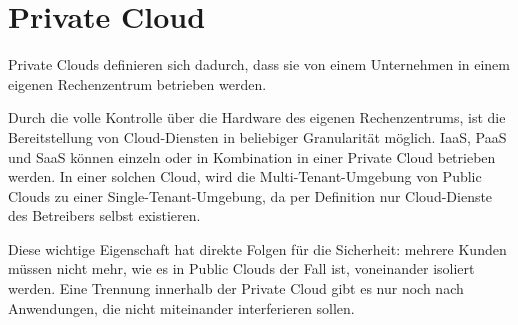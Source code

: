 \documentclass[../main.tex]{subfiles}
\begin{document}



  \section{Private Cloud}
  \label{privateCloud}
    Private Clouds definieren sich dadurch, dass sie von einem Unternehmen in einem eigenen Rechenzentrum betrieben werden.

    Durch die volle Kontrolle über die Hardware des eigenen Rechenzentrums, ist die Bereitstellung von Cloud-Diensten in beliebiger Granularität möglich. IaaS, PaaS und SaaS können einzeln oder in Kombination in einer Private Cloud betrieben werden. In einer solchen Cloud, wird die Multi-Tenant-Umgebung von Public Clouds zu einer Single-Tenant-Umgebung, da per Definition nur Cloud-Dienste des Betreibers selbst existieren.

    Diese wichtige Eigenschaft hat direkte Folgen für die Sicherheit:
    mehrere Kunden müssen nicht mehr, wie es in Public Clouds der Fall ist, voneinander isoliert werden. Eine Trennung innerhalb der Private Cloud gibt es nur noch nach Anwendungen, die nicht miteinander interferieren sollen.
\end{document}
